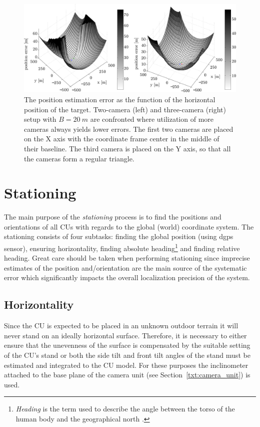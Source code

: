 \begin{figure}[!htb]\centering
	\centering
	\includegraphics[width=0.95\linewidth]{fig/2_vs_3_cus.pdf}
	\caption{The position estimation error as the function of the horizontal position of the target. Two-camera (left) and three-camera (right) setup with $B = 20\ m$ are confronted where utilization of more cameras always yields lower errors. The first two cameras are placed on the X axis with the coordinate frame center in the middle of their baseline. The third camera is placed on the Y axis, so that all the cameras form a regular triangle.} 
	\label{fig:errorMapGivenTargetPosition}
\end{figure}


\section{Stationing} \label{txt:stationing}

The main purpose of the \textit{stationing} process is to find the positions and orientations of all CUs with regards to the global (world) coordinate system. The stationing consists of four subtasks: finding the global position (using \gls{dgps} sensor), ensuring horizontality, finding absolute heading\footnote{\textit{Heading} is the term used to describe the angle between the torso of the human body and the geographical north \cite{Henriksson648760}.} and finding relative heading. Great care should be taken when performing stationing since imprecise estimates of the position and/orientation are the main source of the systematic error which significantly impacts the overall localization precision of the system.

\subsection{Horizontality}
Since the CU is expected to be placed in an unknown outdoor terrain it will never stand on an ideally horizontal surface. Therefore, it is necessary to either ensure that the unevenness of the surface is compensated by the suitable setting of the CU's stand or both the side tilt and front tilt angles of the stand must be estimated and integrated to the CU model. For these purposes the inclinometer attached to the base plane of the camera unit (see Section~\ref{txt:camera_unit}) is used.

